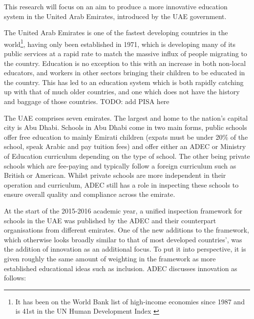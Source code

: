 This research will focus on an aim to produce a more innovative education system in the United Arab Emirates, introduced by the UAE government.

The United Arab Emirates is one of the fastest developing countries in the world\footnote{It has been on the World Bank list of high-income economies since 1987 \cite{worldbank} and is 41st in the UN Human Development Index \cite{WorkforHumanDevelopment2015}}, having only been established in 1971, which is developing many of its public services at a rapid rate to match the massive influx of people migrating to the country. Education is no exception to this with an increase in both non-local educators, and workers in other sectors bringing their children to be educated in the country. This has led to an education system which is both rapidly catching up with that of much older countries, and one which does not have the history and baggage of those countries. TODO: add PISA here

The UAE comprises seven emirates. The largest and home to the nation's capital city is Abu Dhabi. Schools in Abu Dhabi come in two main forms, public schools offer free education to mainly Emirati children (expats must be under 20\% of the school, speak Arabic and pay tuition fees) and offer either an ADEC or Ministry of Education curriculum depending on the type of school. The other being private schools which are fee-paying and typically follow a foreign curriculum such as British or American. Whilst private schools are more independent in their operation and curriculum, ADEC still has a role in inspecting these schools to ensure overall quality and compliance across the emirate.

At the start of the 2015-2016 academic year, a unified inspection framework for schools in the UAE was published by the ADEC and their counterpart organisations from different emirates. One of the new additions to the framework, which otherwise looks broadly similar to that of most developed countries', was the addition of innovation as an additional focus. To put it into perspective, it is given roughly the same amount of weighting in the framework as more established educational ideas such as inclusion. ADEC discusses innovation as follows:

